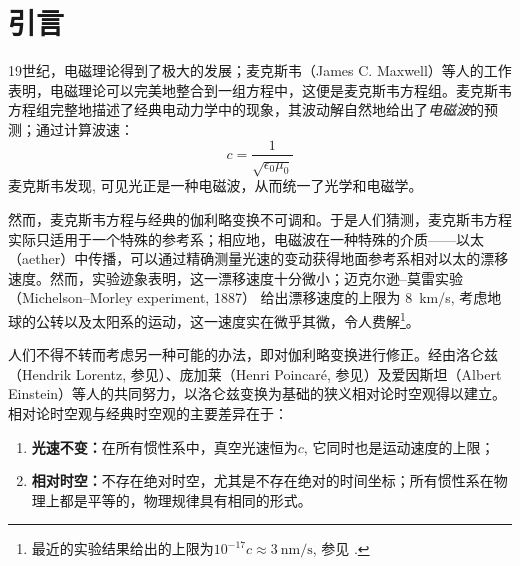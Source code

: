 \documentclass[aps,pre,12pt,preprint,%
	onecolumn,showpacs,showkeys,nofootinbib]{revtex4-1}
\begin{document}
\section{引言}
	19世纪，电磁理论得到了极大的发展；麦克斯韦（James C. Maxwell）等人的工作表明，电磁理论可以完美地整合到一组方程中\supercite{maxwell1865dynamical}，这便是麦克斯韦方程组。麦克斯韦方程组完整地描述了经典电动力学中的现象，其波动解自然地给出了\textit{电磁波}的预测；通过计算波速：
	\begin{equation}
		c = \frac{1}{\sqrt{\epsilon_0\mu_0}}
		\label{eq:lightSpeed}
	\end{equation}
	麦克斯韦发现\supercite{maxwell1865dynamical}, 可见光正是一种电磁波，从而统一了光学和电磁学。
	
	然而，麦克斯韦方程与经典的伽利略变换不可调和。于是人们猜测，麦克斯韦方程实际只适用于一个特殊的参考系；相应地，电磁波在一种特殊的介质——以太（aether）中传播，可以通过精确测量光速的变动获得地面参考系相对以太的漂移速度。然而，实验迹象表明，这一漂移速度十分微小；迈克尔逊--莫雷实验（Michelson–Morley experiment, 1887）\supercite{michelson1887relative} 给出漂移速度的上限为 \SI{8}{\km/\s}, 考虑地球的公转以及太阳系的运动，这一速度实在微乎其微，令人费解\footnote{%
		最近的实验结果给出的上限为$10^{-17}c \approx \SI{3}{\nm/\s}$, 参见 \cite{herrmann2009rotating}. 
	}。
	
	人们不得不转而考虑另一种可能的办法，即对伽利略变换进行修正。经由洛仑兹（Hendrik Lorentz, 参见\cite{lorentz1904electromagnetic}）、庞加莱（Henri Poincaré, 参见\cite{poincare1976measure}）及爱因斯坦（Albert Einstein）等人的共同努力，以洛仑兹变换为基础的狭义相对论时空观得以建立。相对论时空观与经典时空观的主要差异在于：
	\begin{enumerate}[noitemsep]
	\item \textbf{光速不变：}在所有惯性系中，真空光速恒为$c$, 它同时也是运动速度的上限；
	\item \textbf{相对时空：}不存在绝对时空，尤其是不存在绝对的时间坐标；所有惯性系在物理上都是平等的，物理规律具有相同的形式。\vspace{2ex}
	\end{enumerate}
\pagebreak
	
\end{document}
